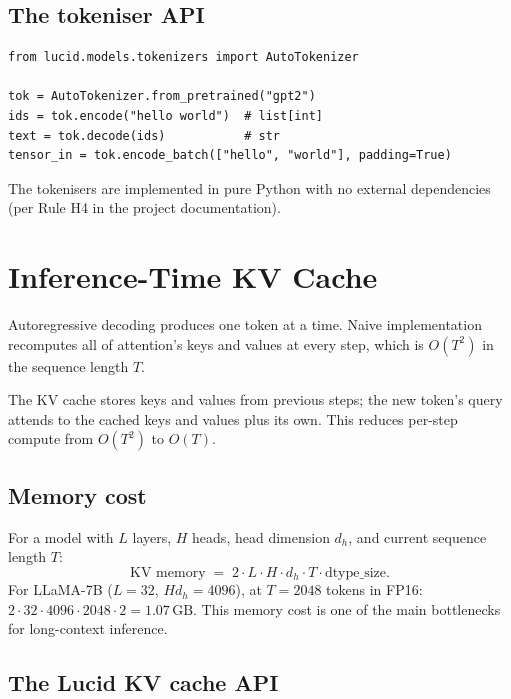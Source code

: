 \subsection{The tokeniser API}
\label{ssec:language_models:tokeniser_api}

\begin{lstlisting}[style=lucid,language=LucidPython]
from lucid.models.tokenizers import AutoTokenizer

tok = AutoTokenizer.from_pretrained("gpt2")
ids = tok.encode("hello world")  # list[int]
text = tok.decode(ids)           # str
tensor_in = tok.encode_batch(["hello", "world"], padding=True)
\end{lstlisting}

The tokenisers are implemented in pure Python with
no external dependencies (per Rule H4 in the project
documentation).

\section{Inference-Time KV Cache}
\label{sec:language_models:kv_cache}

Autoregressive decoding produces one token at a time. Naive
implementation recomputes all of attention's keys and values at
every step, which is $O(T^2)$ in the sequence length $T$.

The KV cache stores keys and values from previous steps; the new
token's query attends to the cached keys and values plus its
own. This reduces per-step compute from $O(T^2)$ to $O(T)$.

\subsection{Memory cost}
\label{ssec:language_models:kv_cache_memory}

For a model with $L$ layers, $H$ heads, head dimension $d_h$,
and current sequence length $T$:
\[
  \text{KV memory} \;=\; 2 \cdot L \cdot H \cdot d_h \cdot T \cdot \text{dtype\_size}.
\]
For LLaMA-7B ($L = 32$, $H d_h = 4096$), at $T = 2048$ tokens
in FP16: $2 \cdot 32 \cdot 4096 \cdot 2048 \cdot 2 = 1.07\,\mathrm{GB}$.
This memory cost is one of the main bottlenecks for long-context
inference.

\subsection{The Lucid KV cache API}
\label{ssec:language_models:kv_cache_api}

